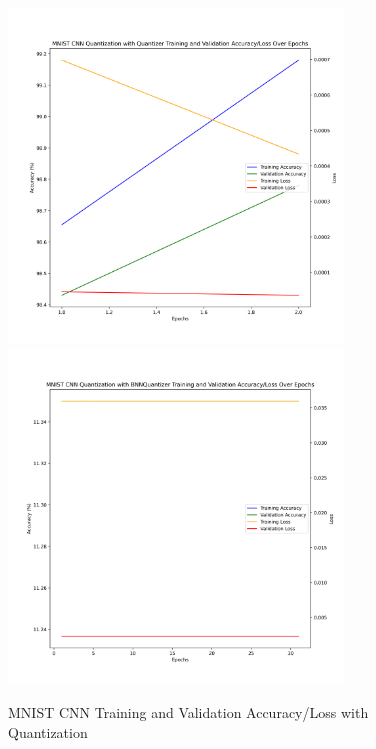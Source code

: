 \documentclass{article}
\begin{document}
\begin{figure}
	\centerline{\includegraphics[width=3.5in]{../proj2/figures/mnist_cnn_QAT_Quantizer.png}\includegraphics[width=3.5in]{../proj2/figures/mnist_cnn_BNNQuantizer.png}}
	\caption{MNIST CNN Training and Validation Accuracy/Loss with Quantization}
	\label{fig:mnist-charts}
\end{figure}
\end{document}
